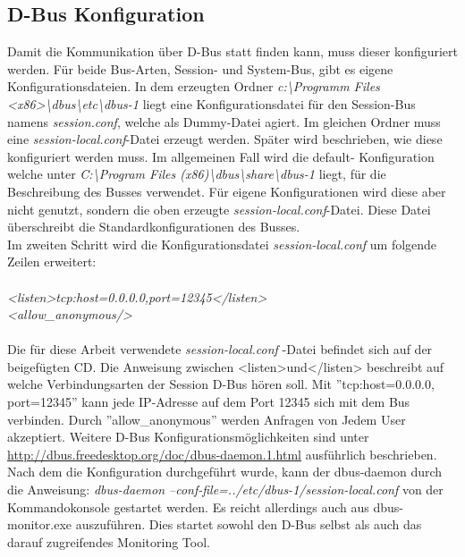\subsection{D-Bus Konfiguration}
Damit die Kommunikation über D-Bus statt finden kann, muss dieser konfiguriert werden. Für beide Bus-Arten, Session- und System-Bus, gibt es eigene Konfigurationsdateien. In dem erzeugten Ordner  \textit{c:\textbackslash Programm Files <x86>\textbackslash dbus\textbackslash etc\textbackslash dbus-1} liegt eine Konfigurationsdatei für den Session-Bus namens \textit{session.conf}, welche als Dummy-Datei agiert. Im gleichen Ordner muss eine \textit{session-local.conf}-Datei erzeugt werden. Später wird beschrieben, wie diese konfiguriert werden muss. Im allgemeinen Fall wird die default- Konfiguration welche unter \textit{C:\textbackslash Program Files (x86)\textbackslash dbus\textbackslash share\textbackslash dbus-1} liegt, für die Beschreibung des Busses verwendet. Für eigene Konfigurationen wird diese aber nicht genutzt, sondern die oben erzeugte \textit{session-local.conf}-Datei. Diese Datei überschreibt die Standardkonfigurationen des Busses.\\
Im zweiten Schritt wird die Konfigurationsdatei  \textit{session-local.conf} um folgende Zeilen erweitert:\\\\ \textit{<listen>tcp:host=0.0.0.0,port=12345</listen>}\\
\textit{ <allow\_anonymous/>}\\\\
Die für diese Arbeit verwendete \textit{session-local.conf} -Datei befindet sich auf der beigefügten CD. Die Anweisung zwischen <listen>und</listen> beschreibt auf welche Verbindungsarten der Session D-Bus hören soll. Mit ''tcp:host=0.0.0.0, port=12345'' kann jede IP-Adresse auf dem Port 12345 sich mit dem Bus verbinden.
Durch ''allow\_anonymous'' werden Anfragen von Jedem User akzeptiert. Weitere D-Bus Konfigurationsmöglichkeiten sind unter \url{http://dbus.freedesktop.org/doc/dbus-daemon.1.html} ausführlich beschrieben.\\
Nach dem die Konfiguration durchgeführt wurde, kann der dbus-daemon  durch die Anweisung: \textit{dbus-daemon --conf-file=../etc/dbus-1/session-local.conf} von der Kommandokonsole gestartet werden. Es reicht allerdings auch aus dbus-monitor.exe auszuführen. Dies startet sowohl den D-Bus selbst als auch das darauf zugreifendes Monitoring Tool.\\
